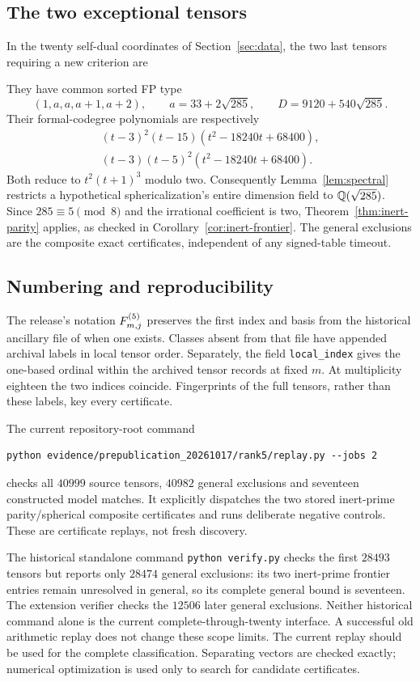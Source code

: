 \subsection{The two exceptional tensors}
In the twenty self-dual coordinates of Section~\ref{sec:data}, the two
last tensors requiring a new criterion are

They have common sorted FP type
\[
 (1,a,a,a+1,a+2),\qquad a=33+2\sqrt{285},
 \qquad D=9120+540\sqrt{285}.
\]
Their formal-codegree polynomials are respectively
\begin{align*}
 (t-3)^2(t-15)(t^2-18240t+68400),\\
 (t-3)(t-5)^2(t^2-18240t+68400).
\end{align*}
Both reduce to $t^2(t+1)^3$ modulo two. Consequently
Lemma~\ref{lem:spectral} restricts a hypothetical sphericalization's
entire dimension field to $\mathbb Q(\sqrt{285})$. Since
$285\equiv5\pmod8$ and the irrational coefficient is two,
Theorem~\ref{thm:inert-parity} applies, as checked in
Corollary~\ref{cor:inert-frontier}. The general exclusions are the
composite exact certificates, independent of any signed-table timeout.

\subsection{Numbering and reproducibility}
The release's notation $F^{(5)}_{m,j}$ preserves the first index and basis
from the historical ancillary file of \cite{VS} when one exists.
Classes absent from that file have appended archival labels in local
tensor order. Separately, the field \texttt{local\_index} gives the
one-based ordinal within the archived tensor records at fixed $m$.
At multiplicity eighteen the two indices coincide. Fingerprints
of the full tensors, rather than these labels, key every certificate.

The current repository-root command
\begin{verbatim}
python evidence/prepublication_20261017/rank5/replay.py --jobs 2
\end{verbatim}
checks all $40999$ source tensors, $40982$ general exclusions and seventeen
constructed model matches. It explicitly dispatches the two stored
inert-prime parity/spherical composite certificates and runs deliberate
negative controls. These are certificate replays, not fresh discovery.

The historical standalone command \texttt{python verify.py} checks the
first $28493$ tensors but reports only $28474$ general exclusions: its two
inert-prime frontier entries remain unresolved in general, so its complete
general bound is seventeen. The extension verifier checks the $12506$
later general exclusions. Neither historical command alone is the current
complete-through-twenty interface. A successful old arithmetic replay does
not change these scope limits. The current replay should be used for the
complete classification. Separating vectors are checked exactly; numerical
optimization is used only to search for candidate certificates.

